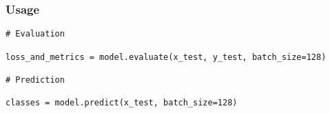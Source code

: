 \begin{frame}[fragile] \frametitle{Usage}
\begin{lstlisting}
# Evaluation

loss_and_metrics = model.evaluate(x_test, y_test, batch_size=128)

# Prediction

classes = model.predict(x_test, batch_size=128)
\end{lstlisting}

\end{frame}









